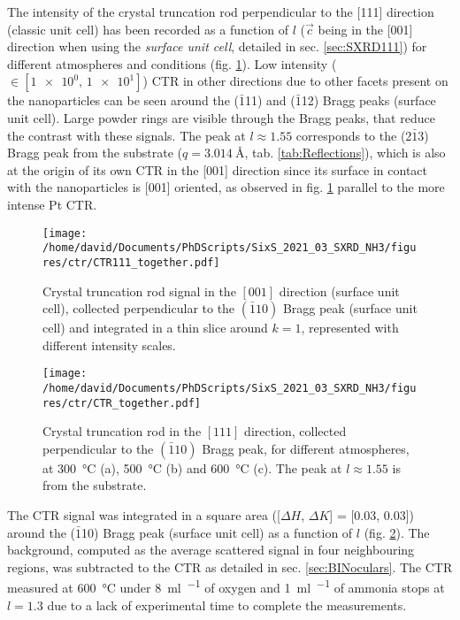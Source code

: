 The intensity of the crystal truncation rod perpendicular to the [111] direction (classic unit cell) has been recorded as a function of $l$ ($\vec{c}$ being in the [001] direction when using the \textit{surface unit cell}, detailed in sec. \ref{sec:SXRD111}) for different atmospheres and conditions (fig. \ref{fig:2DCTR111Particles}).
Low intensity ($\in [\num{1e0},\, \num{1e1}]$) CTR in other directions due to other facets present on the nanoparticles can be seen around the ($\bar{1}$11) and ($\bar{1}$12) Bragg peaks (surface unit cell).
Large powder rings are visible through the Bragg peaks, that reduce the contrast with these signals.
The peak at $l\approx1.55$ corresponds to the (2$\bar{1}$3) Bragg peak from the  substrate ($q = \qty{3.014}{\angstrom}$, tab. \ref{tab:Reflections}), which is also at the origin of its own CTR in the [001] direction since its surface in contact with the nanoparticles is [001] oriented, as observed in fig. \ref{fig:2DCTR111Particles} parallel to the more intense Pt CTR.

\begin{figure}[!htb]
    \centering
    \texttt{[image: /home/david/Documents/PhDScripts/SixS\_2021\_03\_SXRD\_NH3/figures/ctr/CTR111\_together.pdf]}
    \caption{
        Crystal truncation rod signal in the $[001]$ direction (surface unit cell), collected perpendicular to the $(\bar{1}10)$ Bragg peak (surface unit cell) and integrated in a thin slice around $k=1$, represented with different intensity scales.
    }
    \label{fig:2DCTR111Particles}
\end{figure}

\begin{figure}[!htb]
    \centering
    \texttt{[image: /home/david/Documents/PhDScripts/SixS\_2021\_03\_SXRD\_NH3/figures/ctr/CTR\_together.pdf]}
    \caption{
        Crystal truncation rod in the $[111]$ direction, collected perpendicular to the $(\bar{1}10)$ Bragg peak, for different atmospheres, at \qty{300}{\degreeCelsius} (a), \qty{500}{\degreeCelsius} (b) and \qty{600}{\degreeCelsius} (c).
        The peak at $l\approx1.55$ is from the  substrate.
    }
    \label{fig:CTR111Particles}
\end{figure}

The CTR signal was integrated in a square area ([$\Delta H$, $\Delta K$] = [0.03, 0.03]) around the ($\bar{1}$10) Bragg peak (surface unit cell) as a function of $l$ (fig. \ref{fig:CTR111Particles}).
The background, computed as the average scattered signal in four neighbouring regions, was subtracted to the CTR as detailed in sec. \ref{sec:BINoculars}.
The CTR measured at \qty{600}{\degreeCelsius} under \qty{8}{\ml\per\min} of oxygen and \qty{1}{\ml\per\min} of ammonia stops at $l=1.3$ due to a lack of experimental time to complete the measurements.

